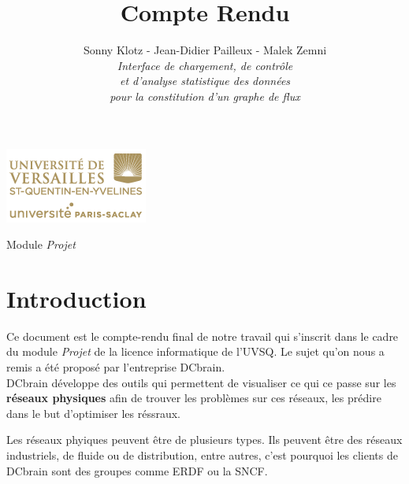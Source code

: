 

\title{\vspace{\fill}\textbf{\Huge Compte Rendu}}
\author{
	Sonny Klotz - Jean-Didier Pailleux - Malek Zemni
	\vspace{2em}\\
	\textit{Interface de chargement, de contrôle}\\\textit{et d’analyse statistique des données}\\\textit{pour la constitution d’un graphe de flux}
	\vspace{2em}
}


\clearpage
\maketitle\vspace{9em}
\begin{center}\includegraphics[scale=0.7]{../Cahier/logo.png}\end{center}
\begin{flushright}Module \textit{Projet}\end{flushright}
\newpage
\tableofcontents
\newpage\clearpage{}

	\section*{Introduction}
		
		Ce document est le compte-rendu final de notre travail qui s'inscrit dans le cadre du module \textit{Projet} de la licence informatique de l'UVSQ. Le sujet qu'on nous a remis a été proposé par l'entreprise DCbrain.\\
		
		DCbrain développe des outils qui permettent de visualiser ce qui ce passe sur les \textbf{réseaux physiques} afin de trouver les problèmes sur ces réseaux, les prédire dans le but d'optimiser les réssraux.
		
		Les réseaux phyiques peuvent être de plusieurs types. Ils peuvent être des réseaux industriels, de fluide ou de distribution, entre autres, c'est pourquoi les clients de DCbrain sont des groupes comme ERDF ou la SNCF.
		
